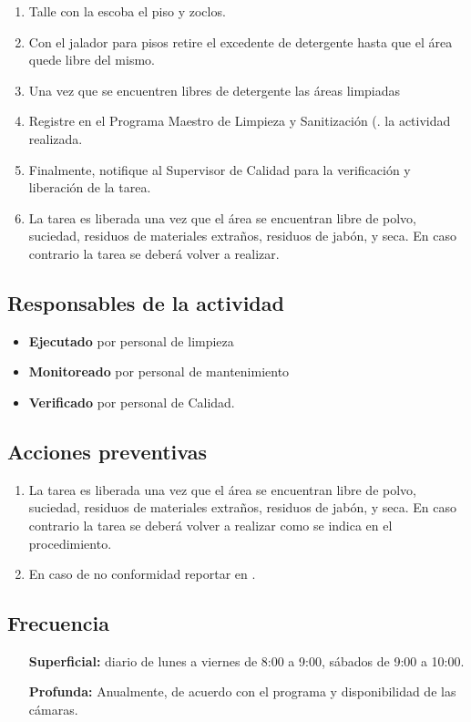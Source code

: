 \begin{enumerate}
	\item Talle con la escoba el piso y zoclos.
	\item Con el jalador para pisos retire el excedente de detergente hasta que el área quede libre del mismo.
	\item Una vez que se encuentren libres de detergente las áreas limpiadas
	\item Registre en el Programa Maestro de Limpieza y Sanitización (\RAC. la actividad realizada.
	\item Finalmente, notifique al Supervisor de Calidad para la verificación y liberación de la tarea.
	\item La tarea es liberada una vez que el área se encuentran libre de polvo, suciedad, residuos de materiales extraños, residuos de jabón, y seca. En caso contrario la tarea se deberá volver a realizar.
\end{enumerate}

\subsection{Responsables de la actividad}
\begin{itemize}
	\item \textbf{Ejecutado} por personal de limpieza
	\item \textbf{Monitoreado} por personal de mantenimiento
	\item \textbf{Verificado} por personal de Calidad.
\end{itemize}

\subsection{Acciones preventivas}
\begin{enumerate}
	\item La tarea es liberada una vez que el área se encuentran libre de polvo, suciedad, residuos de materiales extraños, residuos de jabón, y seca. En caso contrario la tarea se deberá volver a realizar como se indica en el procedimiento.
	\item En caso de no conformidad reportar en \RAC.
\end{enumerate}

\subsection{Frecuencia}
\begin{itemize}
	\item[\textbf{Superficial:}] diario de lunes a viernes de 8:00 a 9:00, sábados de 9:00 a 10:00.
	\item[\textbf{Profunda:}] Anualmente, de acuerdo con el programa y disponibilidad de las cámaras.
\end{itemize}

